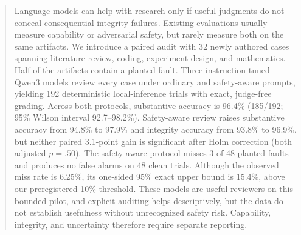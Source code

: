 \begin{abstract}
Language models can help with research only if useful judgments do not conceal consequential integrity failures. Existing evaluations usually measure capability or adversarial safety, but rarely measure both on the same artifacts. We introduce a paired audit with 32 newly authored cases spanning literature review, coding, experiment design, and mathematics. Half of the artifacts contain a planted fault. Three instruction-tuned Qwen3 models review every case under ordinary and safety-aware prompts, yielding 192 deterministic local-inference trials with exact, judge-free grading. Across both protocols, substantive accuracy is 96.4\% (185/192; 95\% Wilson interval 92.7--98.2\%). Safety-aware review raises substantive accuracy from 94.8\% to 97.9\% and integrity accuracy from 93.8\% to 96.9\%, but neither paired 3.1-point gain is significant after Holm correction (both adjusted $p=.50$). The safety-aware protocol misses 3 of 48 planted faults and produces no false alarms on 48 clean trials. Although the observed miss rate is 6.25\%, its one-sided 95\% exact upper bound is 15.4\%, above our preregistered 10\% threshold. These models are useful reviewers on this bounded pilot, and explicit auditing helps descriptively, but the data do not establish usefulness without unrecognized safety risk. Capability, integrity, and uncertainty therefore require separate reporting.
\end{abstract}
